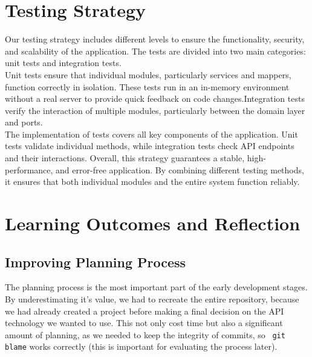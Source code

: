 \documentclass[a4paper, 11pt]{article}
\begin{document}
    \section{Testing Strategy}\label{sec:testing-strategy}
    Our testing strategy includes different levels to ensure the functionality, security, and scalability of the application. The tests are divided into two main categories: unit tests and integration tests.\\
    Unit tests ensure that individual modules, particularly services and mappers, function correctly in isolation. These tests run in an in-memory environment without a real server to provide quick feedback on code changes.Integration tests verify the interaction of multiple modules, particularly between the domain layer and ports.\\
    The implementation of tests covers all key components of the application. Unit tests validate individual methods, while integration tests check API endpoints and their interactions. Overall, this strategy guarantees a stable, high-performance, and error-free application. By combining different testing methods, it ensures that both individual modules and the entire system function reliably.


    \section{Learning Outcomes and Reflection}\label{sec:learning-outcomes-and-reflection}

    \subsection{Improving Planning Process}
    The planning process is the most important part of the early development stages. By underestimating it's value, we had to recreate the entire repository, because we had already created a project before making a final decision on the API technology we wanted to use. This not only cost time but also a significant amount of planning, as we needed to keep the integrity of commits, so ~\lstinline|git blame| works correctly (this is important for evaluating the process later).
\end{document}
